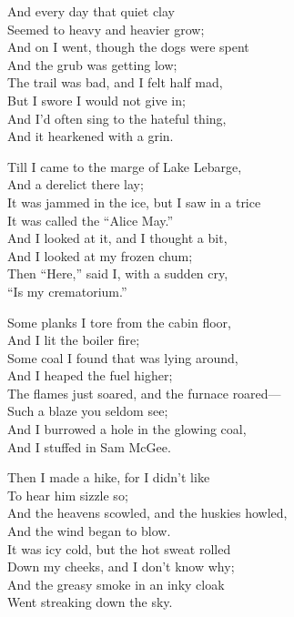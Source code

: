 \begin{poemblock}
And every day that quiet clay\\
\idt Seemed to heavy and heavier grow;\\
And on I went, though the dogs were spent\\
\idt And the grub was getting low;\\
The trail was bad, and I felt half mad,\\
\idt But I swore I would not give in;\\
And I’d often sing to the hateful thing,\\
\idt And it hearkened with a grin.

Till I came to the marge of Lake Lebarge,\\
\idt And a derelict there lay;\\
It was jammed in the ice, but I saw in a trice\\
\idt It was called the “Alice May.”\\
And I looked at it, and I thought a bit,\\
\idt And I looked at my frozen chum;\\
Then “Here,” said I, with a sudden cry,\\
\idt “Is my crematorium.”

Some planks I tore from the cabin floor,\\
\idt And I lit the boiler fire;\\
Some coal I found that was lying around,\\
\hspace*{3em}And I heaped the fuel higher;\\
The flames just soared, and the furnace roared—\\
\idt Such a blaze you seldom see;\\
And I burrowed a hole in the glowing coal,\\
\idt And I stuffed in Sam McGee.

Then I made a hike, for I didn’t like\\
\idt To hear him sizzle so;\\
And the heavens scowled, and the huskies howled,\\
\idt And the wind began to blow.\\
It was icy cold, but the hot sweat rolled\\
\idt Down my cheeks, and I don’t know why;\\
And the greasy smoke in an inky cloak\\
\idt Went streaking down the sky.


\end{poemblock}
